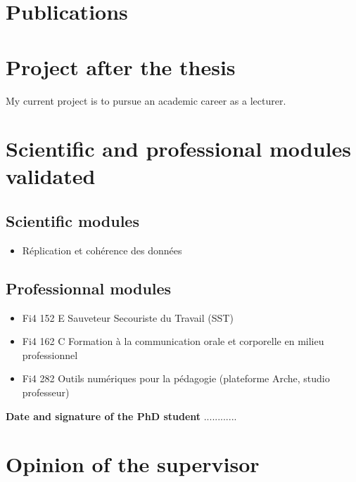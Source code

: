 \documentclass[11pt]{article}
\begin{document}
\section*{Publications}


\nocite{*}

\section*{Project after the thesis}
\hspace{1em} My current project is to pursue an academic career as a lecturer.

\section*{Scientific and professional modules validated}

\subsection*{Scientific modules}

\begin{itemize}
    \item Réplication et cohérence des données
\end{itemize}

\subsection*{Professionnal modules}

\begin{itemize}
    \item Fi4 152 E Sauveteur Secouriste du Travail (SST)
    \item Fi4 162 C Formation à la communication orale et corporelle en milieu professionnel
    \item Fi4 282 Outils numériques pour la pédagogie (plateforme Arche, studio professeur)
\end{itemize}

\bigskip
\bigskip
\noindent\textbf{Date and signature of the PhD student}
............

\newpage

\section*{Opinion of the supervisor}
\end{document}

